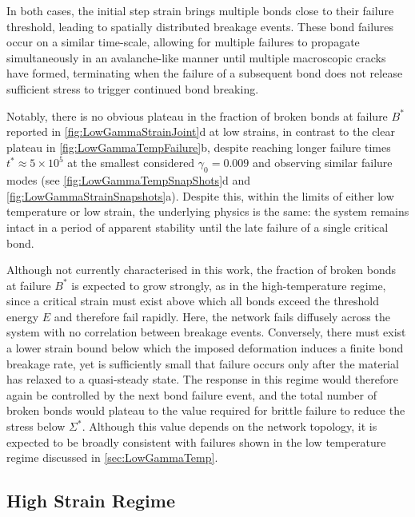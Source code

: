 \documentclass[asymmetricmargins]{library/duthesis}%
\begin{document}
In both cases, the initial step strain brings multiple bonds close to their failure threshold, leading to spatially distributed breakage events. These bond failures occur on a similar time-scale, allowing for multiple failures to propagate simultaneously in an avalanche-like manner until multiple macroscopic cracks have formed, terminating when the failure of a subsequent bond does not release sufficient stress to trigger continued bond breaking.

Notably, there is no obvious plateau in the fraction of broken bonds at failure $B^*$ reported in \cref{fig:LowGammaStrainJoint}d at low strains, in contrast to the clear plateau in \cref{fig:LowGammaTempFailure}b, despite reaching longer failure times $t^*\approx 5\times 10^{5}$ at the smallest considered $\gamma_0=0.009$ and observing similar failure modes (see \cref{fig:LowGammaTempSnapShots}d and \cref{fig:LowGammaStrainSnapshots}a). Despite this, within the limits of either low temperature or low strain, the underlying physics is the same: the system remains intact in a period of apparent stability until the late failure of a single critical bond. 

Although not currently characterised in this work, the fraction of broken bonds at failure $B^*$ is expected to grow strongly, as in the high-temperature regime, since a critical strain must exist above which all bonds exceed the threshold energy $E$ and therefore fail rapidly. Here, the network fails diffusely across the system with no correlation between breakage events. Conversely, there must exist a lower strain bound below which the imposed deformation induces a finite bond breakage rate, yet is sufficiently small that failure occurs only after the material has relaxed to a quasi-steady state. The response in this regime would therefore again be controlled by the next bond failure event, and the total number of broken bonds would plateau to the value required for brittle failure to reduce the stress below $\Sigma^*$. Although this value depends on the network topology, it is expected to be broadly consistent with failures shown in the low temperature regime discussed in \cref{sec:LowGammaTemp}.

\subsection{High Strain Regime}
\end{document}
